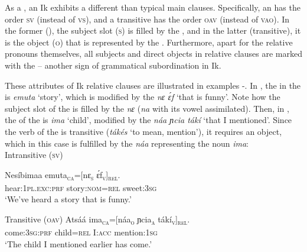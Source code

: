 As a , an Ik  exhibits a different  than typical main clauses. Specifically, an   has the order \textsc{sv} (instead of \textsc{vs}), and a transitive  has the order \textsc{oav} (instead of \textsc{vao}). In the former (), the subject slot (\textsc{s}) is filled by the , and in the latter (transitive), it is the object (\textsc{o}) that is represented by the . Furthermore, apart for the relative pronouns themselves, all subjects and direct objects in relative clauses are marked with the  – another sign of grammatical subordination in Ik.

These attributes of Ik relative clauses are illustrated in examples -. In , the  in the  is \textit{emuta} ‘story’, which is modified by the  \textit{nɛ \'{ɛ}f} ‘that is funny’. Note how the subject slot of the  is filled by the  \textit{nɛ} (\textit{na} with its vowel assimilated). Then, in , the  of the  is \textit{ima} ‘child’, modified by the  \textit{náa ɲcia tákí} ‘that I mentioned’. Since the verb of the  is transitive (\textit{tákés} ‘to mean, mention’), it requires an object, which in this case is fulfilled by the  \textit{náa} representing the noun \textit{ima}:\\




Intransitive (\textsc{sv})

\ea\label{ex:syn:35}
\gll Nesíbimaa     emuta\textsc{\textsubscript{ca}}=[nɛ\textsc{\textsubscript{s}}   \'{ɛ}f\textsc{\textsubscript{v}}{]}\textsc{\textsubscript{rel}}. \\
hear:\textsc{1pl.exc:prf}  story:\textsc{nom}=\textsc{rel}   sweet:\textsc{3sg}    \\
\glt ‘We’ve heard a story that is funny.’ 
\z


Transitive (\textsc{oav})
\ea\label{ex:syn:36}
\gll Atsáá       ima\textsc{\textsubscript{ca}}=[náa\textsc{\textsubscript{o}}   ɲcia\textsc{\textsubscript{a}}   tákí\textsc{\textsubscript{v}}{]}\textsc{\textsubscript{rel}}. \\
come:\textsc{3sg}:\textsc{prf}   child=\textsc{rel}   I:\textsc{acc}   mention:\textsc{1sg}    \\
\glt ‘The child I mentioned earlier has come.’ 
\z




